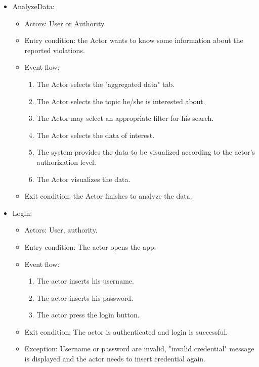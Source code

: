 \begin{itemize}
        \vskip 0.2in
        \item AnalyzeData:
        \begin{itemize}
            \item Actors: User or Authority.
            \item Entry condition: the Actor wants to know some information about the reported violations.
            \item Event flow:
            \begin{enumerate}
                \item The Actor selects the "aggregated data" tab.
                \item The Actor selects the topic he/she is interested about.
                \item The Actor may select an appropriate filter for his search.
                \item The Actor selects the data of interest.
                \item The system provides the data to be visualized according to the actor's authorization level.
                \item The Actor visualizes the data.
            \end{enumerate}
            \item Exit condition: the Actor finishes to analyze the data.
        \end{itemize}
        
        \vskip 0.2in
        \item Login:
        \begin{itemize}
            \item Actors: User, authority.
            \item Entry condition: The actor opens the app.
            \item Event flow:
            \begin{enumerate}
                \item The actor inserts his username.
                \item The actor inserts his password.
                \item The actor press the login button.
            \end{enumerate}
            \item Exit condition: The actor is authenticated and login is successful.
            \item Exception: Username or password are invalid, "invalid credential" message is displayed and the actor needs to insert credential again.
        \end{itemize}
        

\end{itemize}
